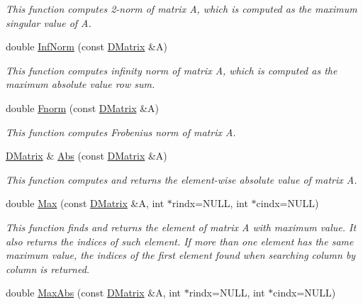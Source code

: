 \begin{DoxyCompactItemize}
\begin{DoxyCompactList}\small\item\em This function computes 2-\/norm of matrix A, which is computed as the maximum singular value of A. \item\end{DoxyCompactList}\item 
double \hyperlink{classDMatrix_afc6bf998f40686caf55730b53cea7150}{InfNorm} (const \hyperlink{classDMatrix}{DMatrix} \&A)
\begin{DoxyCompactList}\small\item\em This function computes infinity norm of matrix A, which is computed as the maximum absolute value row sum. \item\end{DoxyCompactList}\item 
double \hyperlink{classDMatrix_a650d19963c7ca65fe5e8f58c08fc3e55}{Fnorm} (const \hyperlink{classDMatrix}{DMatrix} \&A)
\begin{DoxyCompactList}\small\item\em This function computes Frobenius norm of matrix A. \item\end{DoxyCompactList}\item 
\hyperlink{classDMatrix}{DMatrix} \& \hyperlink{classDMatrix_a8de28f4be67d64533552e166b44ea128}{Abs} (const \hyperlink{classDMatrix}{DMatrix} \&A)
\begin{DoxyCompactList}\small\item\em This function computes and returns the element-\/wise absolute value of matrix A. \item\end{DoxyCompactList}\item 
double \hyperlink{classDMatrix_a734ba2f493c1e69b72dfaf09cfdc1224}{Max} (const \hyperlink{classDMatrix}{DMatrix} \&A, int $\ast$rindx=NULL, int $\ast$cindx=NULL)
\begin{DoxyCompactList}\small\item\em This function finds and returns the element of matrix A with maximum value. It also returns the indices of such element. If more than one element has the same maximum value, the indices of the first element found when searching column by column is returned. \item\end{DoxyCompactList}\item 
double \hyperlink{classDMatrix_a6bd64bff4bf5dea949448371d9e34c14}{MaxAbs} (const \hyperlink{classDMatrix}{DMatrix} \&A, int $\ast$rindx=NULL, int $\ast$cindx=NULL)

\end{DoxyCompactItemize}
